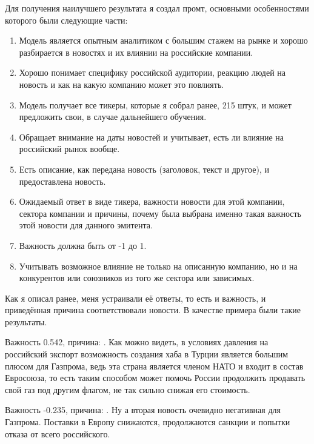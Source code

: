 \documentclass[12pt, a4paper]{article}
\begin{document}
Для получения наилучшего результата я создал промт, основными особенностями которого были следующие части:

\begin{enumerate}
  \item Модель является опытным аналитиком с большим стажем на рынке и хорошо разбирается в новостях и их влиянии на российские компании.

  \item Хорошо понимает специфику российской аудитории, реакцию людей на новость и как на какую компанию может это повлиять.

  \item Модель получает все тикеры, которые я собрал ранее, 215 штук, и может предложить свои, в случае дальнейшего обучения.

  \item Обращает внимание на даты новостей и учитывает, есть ли влияние на российский рынок вообще.

  \item Есть описание, как передана новость (заголовок, текст и другое), и предоставлена новость.

  \item Ожидаемый ответ в виде тикера, важности новости для этой компании, сектора компании и причины, почему была выбрана именно такая важность этой новости для данного эмитента.

  \item Важность должна быть от -1 до 1.

  \item Учитывать возможное влияние не только на описанную компанию, но и на конкурентов или союзников из того же сектора или зависимых.
\end{enumerate}

Как я описал ранее, меня устраивали её ответы, то есть и важность, и приведённая причина соответствовали новости. В качестве примера были такие результаты.

Важность 0.542, причина: . Как можно видеть, в условиях давления на российский экспорт возможность создания хаба в Турции является большим плюсом для Газпрома, ведь эта страна является членом НАТО и входит в состав Евросоюза, то есть таким способом может помочь России продолжить продавать свой газ под другим флагом, не так сильно снижая его стоимость. 

Важность -0.235, причина: . Ну а вторая новость очевидно негативная для Газпрома. Поставки в Европу снижаются, продолжаются санкции и попытки отказа от всего российского.
\end{document}
